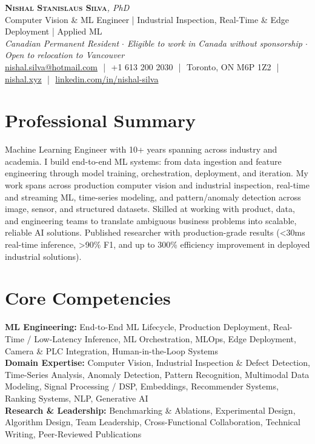 \documentclass[11pt]{article}
\begin{document}
\pagestyle{empty}
\begin{center}
    {\LARGE \scshape \textbf{Nishal Stanislaus Silva}}{\large \textit{, PhD}}
    \\[1pt]
    {\small Computer Vision \& ML Engineer | Industrial Inspection, Real-Time \& Edge Deployment | Applied ML}
    \\[1pt]
    {\footnotesize\textit{Canadian Permanent Resident $\cdot$ Eligible to work in Canada without sponsorship $\cdot$ Open to relocation to Vancouver}}
    \\[1pt]
    {\small \href{mailto:nishal.silva@hotmail.com}{nishal.silva@hotmail.com}
    \,\,|\,\, +1 613 200 2030
    \,\,|\,\, Toronto, ON M6P 1Z2
    \,\,|\,\, \href{https://nishal.xyz}{nishal.xyz}
    \,\,|\,\, \href{https://www.linkedin.com/in/nishal-silva}{linkedin.com/in/nishal-silva}}
\end{center}

\section*{Professional Summary}
Machine Learning Engineer with 10+ years spanning across industry and academia. I build end-to-end ML systems: from data ingestion and feature engineering through model training, orchestration, deployment, and iteration. My work spans across production computer vision and industrial inspection, real-time and streaming ML, time-series modeling, and pattern/anomaly detection across image, sensor, and structured datasets. Skilled at working with product, data, and engineering teams to translate ambiguous business problems into scalable, reliable AI solutions. Published researcher with production-grade results (<30ms real-time inference, >90\% F1, and up to 300\% efficiency improvement in deployed industrial solutions).

\section*{Core Competencies}
\textbf{ML Engineering:} End-to-End ML Lifecycle, Production Deployment, Real-Time / Low-Latency Inference, ML Orchestration, MLOps, Edge Deployment, Camera \& PLC Integration, Human-in-the-Loop Systems\\
\textbf{Domain Expertise:} Computer Vision, Industrial Inspection \& Defect Detection, Time-Series Analysis, Anomaly Detection, Pattern Recognition, Multimodal Data Modeling, Signal Processing / DSP, Embeddings, Recommender Systems, Ranking Systems, NLP, Generative AI\\
\textbf{Research \& Leadership:} Benchmarking \& Ablations, Experimental Design, Algorithm Design, Team Leadership, Cross-Functional Collaboration, Technical Writing, Peer-Reviewed Publications
\end{document}
